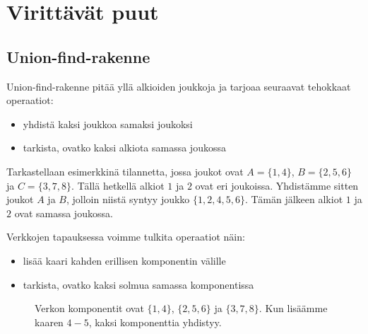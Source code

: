 \chapter{Virittävät puut}

\section{Union-find-rakenne}

Union-find-rakenne pitää yllä alkioiden joukkoja ja tarjoaa
seuraavat tehokkaat operaatiot:

\begin{itemize}
\item yhdistä kaksi joukkoa samaksi joukoksi
\item tarkista, ovatko kaksi alkiota samassa joukossa
\end{itemize}

Tarkastellaan esimerkkinä tilannetta, jossa joukot ovat
$A=\{1,4\}$, $B=\{2,5,6\}$ ja $C=\{3,7,8\}$.
Tällä hetkellä alkiot $1$ ja $2$ ovat eri joukoissa.
Yhdistämme sitten joukot $A$ ja $B$,
jolloin niistä syntyy joukko $\{1,2,4,5,6\}$.
Tämän jälkeen alkiot $1$ ja $2$ ovat samassa joukossa.

Verkkojen tapauksessa voimme tulkita operaatiot näin:

\begin{itemize}
\item lisää kaari kahden erillisen komponentin välille
\item tarkista, ovatko kaksi solmua samassa komponentissa
\end{itemize}

\begin{figure}
\center
\begin{center}
\end{center}
\caption{Verkon komponentit ovat $\{1,4\}$, $\{2,5,6\}$ ja $\{3,7,8\}$.
Kun lisäämme kaaren $4-5$, kaksi komponenttia yhdistyy.}
\label{fig:veryhd}
\end{figure}


